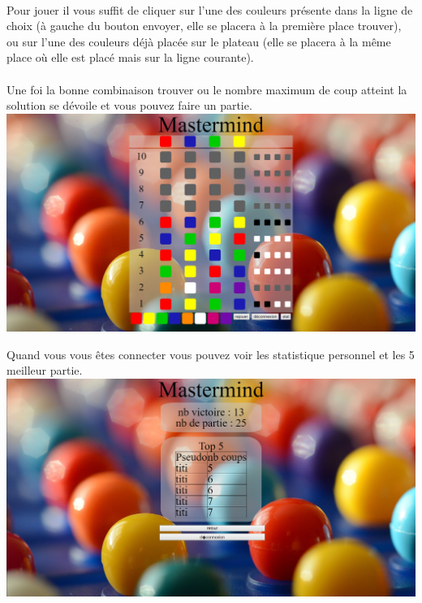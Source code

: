 \documentclass{article}
\begin{document}
        \paragraph{}
        Pour jouer il vous suffit de cliquer sur l'une des couleurs présente dans la ligne de choix (à gauche du bouton envoyer, elle se placera à la première place trouver), ou sur l'une des couleurs déjà placée sur le plateau (elle se placera à la même place où elle est placé mais sur la ligne courante).
        
        \paragraph{}
        Une foi la bonne combinaison trouver ou le nombre maximum de coup atteint la solution se dévoile et vous pouvez faire un partie.\\
        \includegraphics[width=\linewidth]{victoir}\\
        
\clearpage

        Quand vous vous êtes connecter vous pouvez voir les statistique personnel et les 5 meilleur partie.\\
        \includegraphics[width=\linewidth]{stat}\\
        
\end{document}
